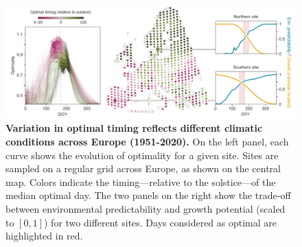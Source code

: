 \documentclass[11pt,letter]{article}
\begin{document}
\begin{figure}[h]
\hspace*{-1.2cm}
\includegraphics{local_optimality_alt.pdf}
\vspace*{-0.7cm}
\caption{\textbf{Variation in optimal timing reflects different climatic conditions across Europe (1951-2020).} On the left panel, each curve shows the evolution of optimality for a given site. Sites are sampled on a regular grid across Europe, as shown on the central map. Colors indicate the timing---relative to the solstice---of the median optimal day. The two panels on the right show the trade-off between environmental predictability and growth potential (scaled to $[0,1]$) for two different sites. Days considered as optimal are highlighted in red.}
\label{fig:localoptimality}
\end{figure}



\end{document}
